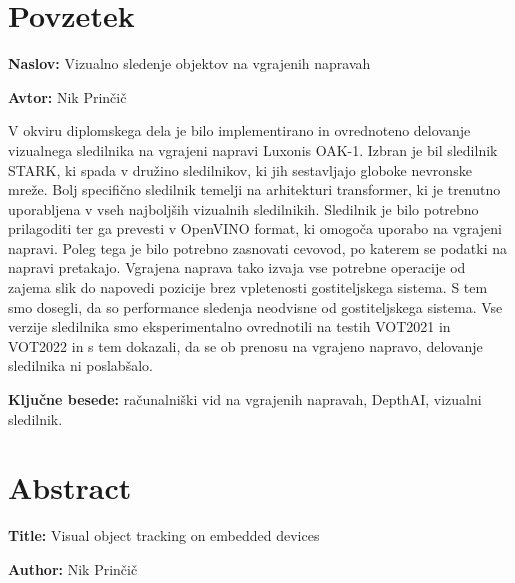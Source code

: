 \documentclass[a4paper,12pt,openright]{book}
\newcommand{\ttitle}{Vizualno sledenje objektov na vgrajenih napravah}
\newcommand{\ttitleEn}{Visual object tracking on embedded devices}
\newcommand{\tauthor}{Nik Prinčič}
\newcommand{\tkeywords}{računalniški vid na vgrajenih napravah, DepthAI, vizualni sledilnik}
\newcommand{\clearemptydoublepage}{\newpage{\pagestyle{empty}\cleardoublepage}}
\begin{document}
\clearemptydoublepage

\chapter*{Povzetek}

\noindent\textbf{Naslov:} \ttitle
\bigskip

\noindent\textbf{Avtor:} \tauthor
\bigskip

\noindent V okviru diplomskega dela je bilo implementirano in ovrednoteno delovanje vizualnega sledilnika na vgrajeni napravi Luxonis OAK-1. Izbran je bil sledilnik STARK, ki spada v družino sledilnikov, ki jih sestavljajo globoke nevronske mreže. Bolj specifično sledilnik temelji na arhitekturi transformer, ki je trenutno uporabljena v vseh najboljših vizualnih sledilnikih. Sledilnik je bilo potrebno prilagoditi ter ga prevesti v OpenVINO format, ki omogoča uporabo na vgrajeni napravi. Poleg tega je bilo potrebno zasnovati cevovod, po katerem se podatki na napravi pretakajo. Vgrajena naprava tako izvaja vse potrebne operacije od zajema slik do napovedi pozicije brez vpletenosti gostiteljskega sistema. S tem smo dosegli, da so performance sledenja neodvisne od gostiteljskega sistema. Vse verzije sledilnika smo eksperimentalno ovrednotili na testih VOT2021 in VOT2022 in s tem dokazali, da se ob prenosu na vgrajeno napravo, delovanje sledilnika ni poslabšalo.
\bigskip

\noindent\textbf{Ključne besede:} \tkeywords.
\clearemptydoublepage

\chapter*{Abstract}

\noindent\textbf{Title:} \ttitleEn
\bigskip

\noindent\textbf{Author:} \tauthor
\bigskip
\end{document}

